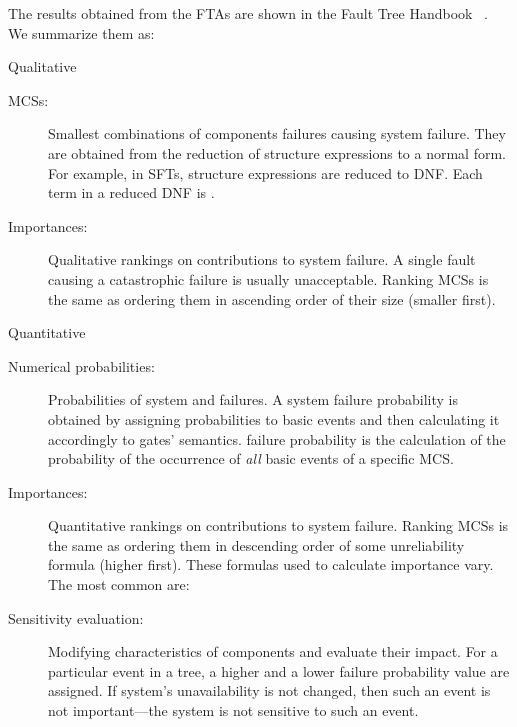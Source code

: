 \documentclass[12pt,openright,twoside,a4paper,oldfontcommands,english,brazil,final]{abntex2}
\theoremstyle{theo}
\def\FThandbook{Fault Tree Handbook~\cite{VGR+1981}\index{Fault Tree!Handbook}%
  \gdef\FThandbook{Fault Tree Handbook\index{Fault Tree!Handbook}\xspace}%
  \xspace}
\begin{document}
\begin{sloppypar}
The results obtained from the \acp{FTA} are shown in the \FThandbook.
We summarize them as:
%
\begin{alineas}
  \item Qualitative
  \begin{description}
    \item[\Acp{MCS}:]
    Smallest combinations of components failures causing system failure.
    They are obtained from the reduction of structure expressions to a normal form.
    For example, in \acp{SFT}, structure expressions are reduced to \ac{DNF}.
    Each term in a reduced \ac{DNF} is .
    \item[Importances:]
    Qualitative rankings on contributions to system failure.
    A single fault causing a catastrophic failure is usually unacceptable.
    Ranking \acp{MCS} is the same as ordering them in ascending order of their size (smaller first).
  \end{description}
  \item Quantitative
  \begin{description}
    \item[Numerical probabilities:]
    Probabilities of system and  failures.
    A system failure probability is obtained by assigning probabilities to basic events and then calculating it accordingly to gates' semantics.
     failure probability is the calculation of the probability of the occurrence of \emph{all} basic events of a specific \ac{MCS}.
    \item[Importances:]
    Quantitative rankings on contributions to system failure.
    Ranking \acp{MCS} is the same as ordering them in descending order of some unreliability formula (higher first).
    These formulas used to calculate importance vary.
    The most common are:
    \item[Sensitivity evaluation:]
    Modifying characteristics of components and evaluate their impact.
    For a particular event in a tree, a higher and a lower failure probability value are assigned.
    If system's unavailability is not changed, then such an event is not important---the system is not sensitive to such an event.
  \end{description}\end{alineas}
\end{sloppypar}
\end{document}
